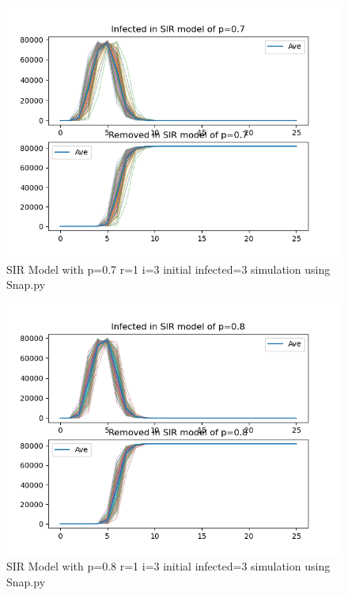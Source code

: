 \documentclass{subfile}
\begin{document}
  \begin{figure}
  \includegraphics[scale=0.8]{sirp07r1i3s3}
  \caption[SIR p=0.7,r=1,i=3,init infected=3]{SIR Model with p=0.7 r=1 i=3 initial infected=3 simulation using Snap.py}
  \end{figure}
  \begin{figure}
  \includegraphics[scale=0.8]{sirp08r1i3s3}
  \caption[SIR p=0.8,r=1,i=3,init infected=3]{SIR Model with p=0.8 r=1 i=3 initial infected=3 simulation using Snap.py}
  \end{figure}
\end{document}
